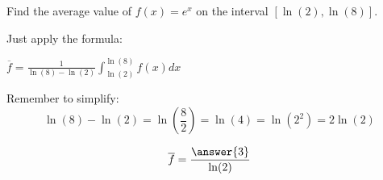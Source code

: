 \documentclass{ximera}
\author{Steven Gubkin\and Nela lakos}
\begin{document}
\begin{exercise}

Find the average value of $f(x)=e^x$ on the interval $[\ln(2),\ln(8)]$.
\begin{hint}
Just apply the formula:

 $\overline{f}=\frac{1}{\ln(8)-\ln(2)}\int_{\ln(2)}^{\ln(8) }f(x) dx$
\end{hint}
\begin{hint}
Remember to simplify:
\[
\ln(8)-\ln(2)=\ln\left(\frac{8}{2}\right)=\ln(4)=\ln(2^2)=2\ln (2)
\]

\end{hint}
\begin{prompt}
\[
\overline{f}=\frac{\answer{3}}{\ln(2)}
\]
\end{prompt}

\end{exercise}
\end{document}
